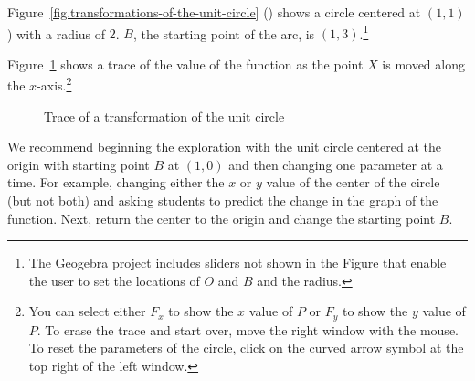 Figure~\ref{fig.transformations-of-the-unit-circle} () shows a circle centered at $(1,1)$) with a radius of $2$. $B$, the starting point of the arc, is $(1,3)$.\footnote{The Geogebra project includes sliders not shown in the Figure that enable the user to set the locations of $O$ and $B$ and the radius.}

Figure~\ref{fig.trace-of-a-transformation-of-the-unit-circle} shows a trace of the value of the function as the point $X$ is moved along the $x$-axis.\footnote{You can select either $F_x$ to show the $x$ value of $P$ or $F_y$ to show the $y$ value of $P$. To erase the trace and start over, move the right window with the mouse. To reset the parameters of the circle, click on the curved arrow symbol at the top right of the left window.}

\begin{figure}[hbt]
\begin{center}
\caption{Trace of a transformation of the unit circle}\label{fig.trace-of-a-transformation-of-the-unit-circle}
\end{center}
\end{figure}

We recommend beginning the exploration with the unit circle centered at the origin with starting point $B$ at $(1,0)$ and then changing one parameter at a time.
For example, changing either the $x$ or $y$ value of the center of the circle (but not both) and asking students to predict the change in the graph of the function.
Next, return the center to the origin and change the starting point $B$.

